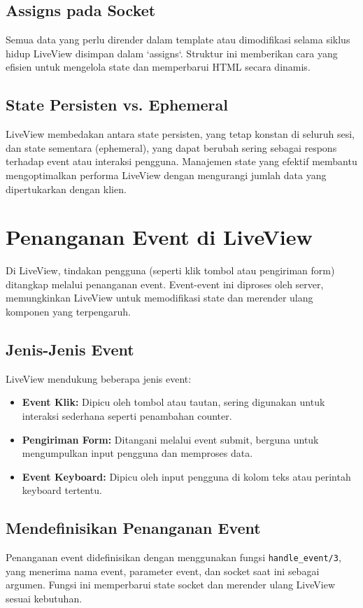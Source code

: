 \subsection{Assigns pada Socket}
Semua data yang perlu dirender dalam template atau dimodifikasi selama siklus hidup LiveView disimpan dalam `assigns`. Struktur ini memberikan cara yang efisien untuk mengelola state dan memperbarui HTML secara dinamis.

\subsection{State Persisten vs. Ephemeral}
LiveView membedakan antara state persisten, yang tetap konstan di seluruh sesi, dan state sementara (ephemeral), yang dapat berubah sering sebagai respons terhadap event atau interaksi pengguna. Manajemen state yang efektif membantu mengoptimalkan performa LiveView dengan mengurangi jumlah data yang dipertukarkan dengan klien.

\section{Penanganan Event di LiveView}
Di LiveView, tindakan pengguna (seperti klik tombol atau pengiriman form) ditangkap melalui penanganan event. Event-event ini diproses oleh server, memungkinkan LiveView untuk memodifikasi state dan merender ulang komponen yang terpengaruh.

\subsection{Jenis-Jenis Event}
LiveView mendukung beberapa jenis event:
\begin{itemize}
	\item \textbf{Event Klik:} Dipicu oleh tombol atau tautan, sering digunakan untuk interaksi sederhana seperti penambahan counter.
	\item \textbf{Pengiriman Form:} Ditangani melalui event submit, berguna untuk mengumpulkan input pengguna dan memproses data.
	\item \textbf{Event Keyboard:} Dipicu oleh input pengguna di kolom teks atau perintah keyboard tertentu.
\end{itemize}

\subsection{Mendefinisikan Penanganan Event}
Penanganan event didefinisikan dengan menggunakan fungsi \texttt{handle\_event/3}, yang menerima nama event, parameter event, dan socket saat ini sebagai argumen. Fungsi ini memperbarui state socket dan merender ulang LiveView sesuai kebutuhan.

